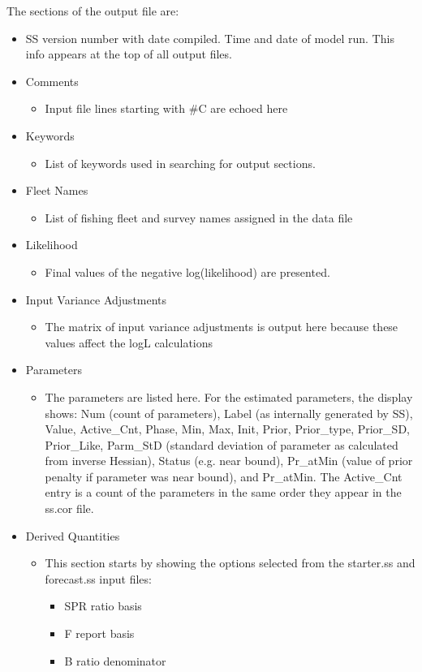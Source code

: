 The sections of the output file are:
\begin{itemize}
	\item SS version number with date compiled.  Time and date of model run.  This info appears at the top of all output files.
	\item Comments
		\begin{itemize}
			\item 	Input file lines starting with \#C are echoed here
		\end{itemize}
	\item Keywords
		\begin{itemize}
			\item List of keywords used in searching for output sections.
		\end{itemize}
	\item Fleet Names
		\begin{itemize}
			\item List of fishing fleet and survey names assigned in the data file
		\end{itemize}
	\item Likelihood
		\begin{itemize}
			\item Final values of the negative log(likelihood) are presented.
		\end{itemize}
	\item Input Variance Adjustments
		\begin{itemize}
			\item The matrix of input variance adjustments is output here because these values affect the logL calculations
		\end{itemize}
	\item Parameters
		\begin{itemize}
			\item The parameters are listed here.  For the estimated parameters, the display shows: Num (count of parameters), Label (as internally generated by SS), Value, Active\_Cnt, Phase, Min, Max, Init, Prior, Prior\_type, Prior\_SD, Prior\_Like, Parm\_StD (standard deviation of parameter as calculated from inverse Hessian), Status (e.g. near bound), Pr\_atMin (value of prior penalty if parameter was near bound), and  Pr\_atMin.  The Active\_Cnt entry is a count of the parameters in the same order they appear in the ss.cor file.
		\end{itemize}
	\item Derived Quantities
		\begin{itemize}
			\item This section starts by showing the options selected from the starter.ss and forecast.ss input files:
				\begin{itemize}
					\item SPR ratio basis
					\item F report basis
					\item B ratio denominator
				\end{itemize}
		\end{itemize}
\end{itemize}

